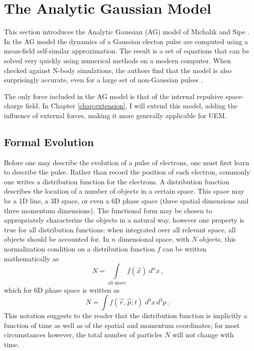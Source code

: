 
\section{The Analytic Gaussian Model} \label{sec:ms_model}

This section introduces the Analytic Gaussian (AG) model of Michalik and Sipe \cite{michalik_analytic_2006}.
In the AG model the dynamics of a Gaussian electon pulse are computed using a mean-field self-similar approximation.
The result is a set of equations that can be solved very quickly using numerical methods on a modern computer.
When checked against N-body simulations, the authors find that the model is also surprisingly accurate, even for a large set of non-Gaussian pulses \cite{michalik_analytic_2006,michalik_evolution_2009}.

The only force included in the AG model is that of the internal repulsive space-charge field.
In Chapter \ref{chap:extension}, I will extend this model, adding the influence of external forces, making it more generally applicable for UEM.

\subsection{Formal Evolution} \label{sec:formal_evolution}

Before one may describe the evolution of a pulse of electrons, one must first learn to describe the pulse.
Rather than record the position of each electron, commonly one writes a distribution function for the electrons.
A distribution function describes the location of a number of objects in a certain space.
This space may be a 1D line, a 3D space, or even a 6D phase space (three spatial dimensions and three momentum dimensions).
The functional form may be chosen to appropriately characterize the objects in a natural way, however one property is true for all distribution functions: when integrated over all relevant space, all objects should be accounted for.
In $n$ dimensional space, with $N$ objects, this normalization condition on a distribution function $f$ can be written mathematically as
\begin{equation}
  N = \int\limits_{\text{all space}} \!\!\! f(\vec{x}) \; d^{n}x \,\text{,}
\end{equation}
which for 6D phase space is written as
\begin{equation} \label{eq:normalization}
  N = \int f (\vec{r}, \vec{p}; t) \; d^{3}x\,d^{3}p \,\text{.}
\end{equation}
This notation suggests to the reader that the distribution function is implicitly a function of time as well as of the spatial and momentum coordinates; for most circumstances however, the total number of particles $N$ will not change with time.

